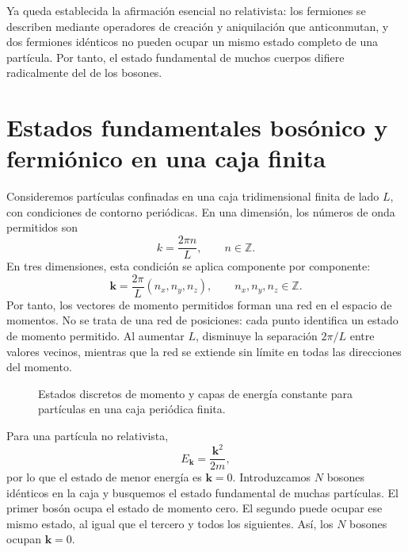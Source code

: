 Ya queda establecida la afirmación esencial no relativista: los fermiones se describen mediante operadores de creación y aniquilación que anticonmutan, y dos fermiones idénticos no pueden ocupar un mismo estado completo de una partícula. Por tanto, el estado fundamental de muchos cuerpos difiere radicalmente del de los bosones.

\section{Estados fundamentales bosónico y fermiónico en una caja finita}

Consideremos partículas confinadas en una caja tridimensional finita de lado \(L\), con condiciones de contorno periódicas. En una dimensión, los números de onda permitidos son
\begin{equation}
k=\frac{2\pi n}{L},
\qquad n\in\mathbb{Z}.
\end{equation}
En tres dimensiones, esta condición se aplica componente por componente:
\begin{equation}
\mathbf{k}=\frac{2\pi}{L}(n_x,n_y,n_z),
\qquad n_x,n_y,n_z\in\mathbb{Z}.
\end{equation}
Por tanto, los vectores de momento permitidos forman una red en el espacio de momentos. No se trata de una red de posiciones: cada punto identifica un estado de momento permitido. Al aumentar \(L\), disminuye la separación \(2\pi/L\) entre valores vecinos, mientras que la red se extiende sin límite en todas las direcciones del momento.

\begin{figure}
\centering
{}
\caption{Estados discretos de momento y capas de energía constante para partículas en una caja periódica finita.}
\end{figure}

Para una partícula no relativista,
\begin{equation}
E_{\mathbf{k}}=\frac{\mathbf{k}^2}{2m},
\end{equation}
por lo que el estado de menor energía es \(\mathbf{k}=0\). Introduzcamos \(N\) bosones idénticos en la caja y busquemos el estado fundamental de muchas partículas. El primer bosón ocupa el estado de momento cero. El segundo puede ocupar ese mismo estado, al igual que el tercero y todos los siguientes. Así, los \(N\) bosones ocupan \(\mathbf{k}=0\).

